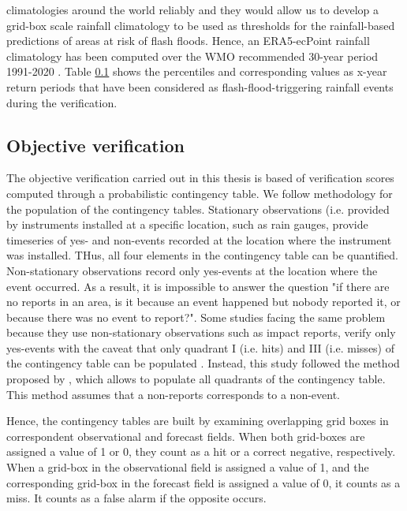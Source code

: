 climatologies around the world reliably \citep{Pillosu_2025a} and they would allow us to develop a grid-box scale rainfall climatology to be used as thresholds for the rainfall-based predictions of areas at risk of flash floods. Hence, an ERA5-ecPoint rainfall climatology has been computed over the WMO recommended 30-year period 1991-2020 \citep{WMO_2017}. Table \ref{} shows the percentiles and corresponding values as x-year return periods that have been considered as flash-flood-triggering rainfall events during the verification.


\subsection{Objective verification}

The objective verification carried out in this thesis is based of verification scores computed through a probabilistic contingency table. We follow \citet{Pillosu_2024} methodology for the population of the contingency tables. Stationary observations (i.e. provided by instruments installed at a specific location, such as rain gauges, provide timeseries of yes- and non-events recorded at the location where the instrument was installed. THus, all four elements in the contingency table can be quantified. Non-stationary observations record only yes-events at the location where the event occurred. As a result, it is impossible to answer the question "if there are no reports in an area, is it because an event happened but nobody reported it, or because there was no event to report?". Some studies facing the same problem because they use non-stationary observations such as impact reports, verify only yes-events with the caveat that only quadrant I (i.e. hits) and III (i.e. misses) of the contingency table can be populated \citep{Robbins_2018}. Instead, this study followed the method proposed by \citet{Tsonevsky_2018}, which allows to populate all quadrants of the contingency table. This method assumes that a non-reports corresponds to a non-event. 

Hence, the contingency tables are built by examining overlapping grid boxes in correspondent observational and forecast fields. When both grid-boxes are assigned a value of 1 or 0, they count as a hit or a correct negative, respectively. When a grid-box in the observational field is assigned a value of 1, and the corresponding grid-box in the forecast field is assigned a value of 0, it counts as a miss. It counts as a false alarm if the opposite occurs. 


